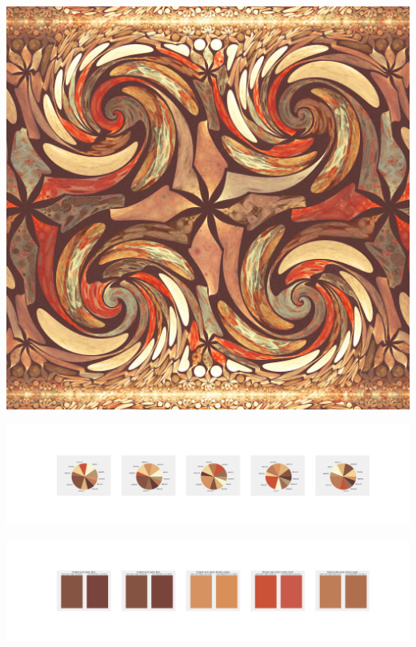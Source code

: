 \documentclass[11pt]{article}
\begin{document}
\begin{landscape}
    \begin{center}
    \includegraphics[width=\textwidth]{./nbimg/file (448).jpg}
    \end{center}

    \begin{center}
    \includegraphics[width=250mm]{./nbimg/pie-387.jpg}
    \end{center}

    \begin{center}
    \includegraphics[width=250mm]{./nbimg/peak-387.jpg}
    \end{center}
    


\end{landscape}
\end{document}
